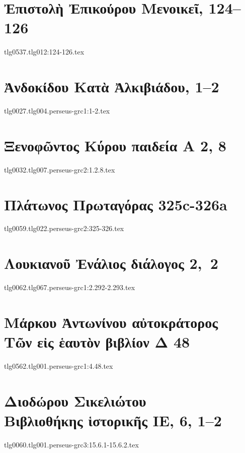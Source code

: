 \documentclass[a4paper,12pt,twoside]{report}
\begin{document}
\newpage




\chapter[Ἐπίκουρος Μενοικεῖ]{\textgreek[variant=ancient]{Ἐπιστολὴ Ἐπικούρου Μενοικεῖ,} 124–126}
{tlg0537.tlg012:124-126.tex}
\chapter[Ἀνδοκίδου Κατὰ Ἀλκιβιάδου]{\textgreek[variant=ancient]{Ἀνδοκίδου Κατὰ Ἀλκιβιάδου,} 1–2}
{tlg0027.tlg004.perseus-grc1:1-2.tex}
\chapter[Ξενοφῶντος Κύρου παιδεία]{\textgreek[variant=ancient]{Ξενοφῶντος Κύρου παιδεία Α} 2, 8}
{tlg0032.tlg007.perseus-grc2:1.2.8.tex}
%
\chapter[Πλάτωνος Πρωταγόρας]{\textgreek[variant=ancient]{Πλάτωνος Πρωταγόρας} 325c-326a}
{tlg0059.tlg022.perseus-grc2:325-326.tex}
%
\chapter[Λουκιανοῦ Ἐνάλιος διάλογος]{\textgreek[variant=ancient]{Λουκιανοῦ Ἐνάλιος διάλογος} 2,~2}
{tlg0062.tlg067.perseus-grc1:2.292-2.293.tex}
\chapter[Μάρκου Ἀντωνίνου Τῶν εἰς ἑαυτὸν Δ]{\textgreek[variant=ancient]{Μάρκου Ἀντωνίνου αὐτοκράτορος \\Τῶν εἰς ἑαυτὸν βιβλίον Δ} 48}
{tlg0562.tlg001.perseus-grc1:4.48.tex}
\chapter[Διοδώρου Βιβλιοθήκης ἱστορικής ΙΕ]{\textgreek[variant=ancient]{Διοδώρου Σικελιώτου \\Βιβλιοθήκης ἱστορικῆς ΙΕ,} 6, 1–2}
{tlg0060.tlg001.perseus-grc3:15.6.1-15.6.2.tex}
\end{document}

